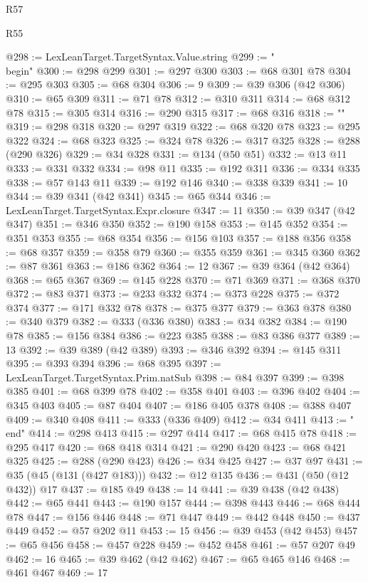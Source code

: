 \begin{lexlean}{R57}
\begin{lexlean}{R55}
\begin{coremodule}
{{{{{{{{{{{{{{{{{{{{{{{{{{{{{{{{{{{{{{{{{{{{{{{{{{{{{{{{{{{{@298 := LexLeanTarget.TargetSyntax.Value.string
@299 := "\\begin{"
@300 := @298 @299
@301 := @297 @300
@303 := @68 @301 @78
@304 := @295 @303
@305 := @68 @304
@306 := 9
@309 := @39 @306 (@42 @306)
@310 := @65 @309
@311 := @71 @78
@312 := @310 @311
@314 := @68 @312 @78
@315 := @305 @314
@316 := @290 @315
@317 := @68 @316
@318 := "}"
@319 := @298 @318
@320 := @297 @319
@322 := @68 @320 @78
@323 := @295 @322
@324 := @68 @323
@325 := @324 @78
@326 := @317 @325
@328 := @288 (@290 @326)
@329 := @34 @328
@331 := @134 (@50 @51)
@332 := @13 @11
@333 := @331 @332
@334 := @98 @11
@335 := @192 @311
@336 := @334 @335
@338 := @57 @143 @11
@339 := @192 @146
@340 := @338 @339
@341 := 10
@344 := @39 @341 (@42 @341)
@345 := @65 @344
@346 := LexLeanTarget.TargetSyntax.Expr.closure
@347 := 11
@350 := @39 @347 (@42 @347)
@351 := @346 @350
@352 := @190 @158
@353 := @145 @352
@354 := @351 @353
@355 := @68 @354
@356 := @156 @103
@357 := @188 @356
@358 := @68 @357
@359 := @358 @79
@360 := @355 @359
@361 := @345 @360
@362 := @87 @361
@363 := @186 @362
@364 := 12
@367 := @39 @364 (@42 @364)
@368 := @65 @367
@369 := @145 @228
@370 := @71 @369
@371 := @368 @370
@372 := @83 @371
@373 := @233 @332
@374 := @373 @228
@375 := @372 @374
@377 := @171 @332 @78
@378 := @375 @377
@379 := @363 @378
@380 := @340 @379
@382 := @333 (@336 @380)
@383 := @34 @382
@384 := @190 @78
@385 := @156 @384
@386 := @223 @385
@388 := @83 @386 @377
@389 := 13
@392 := @39 @389 (@42 @389)
@393 := @346 @392
@394 := @145 @311
@395 := @393 @394
@396 := @68 @395
@397 := LexLeanTarget.TargetSyntax.Prim.natSub
@398 := @84 @397
@399 := @398 @385
@401 := @68 @399 @78
@402 := @358 @401
@403 := @396 @402
@404 := @345 @403
@405 := @87 @404
@407 := @186 @405 @378
@408 := @388 @407
@409 := @340 @408
@411 := @333 (@336 @409)
@412 := @34 @411
@413 := "\\end{"
@414 := @298 @413
@415 := @297 @414
@417 := @68 @415 @78
@418 := @295 @417
@420 := @68 @418 @314
@421 := @290 @420
@423 := @68 @421 @325
@425 := @288 (@290 @423)
@426 := @34 @425
@427 := @37 @97
@431 := @35 (@45 (@131 (@427 @183)))
@432 := @12 @135
@436 := @431 (@50 (@12 @432)) @17
@437 := @185 @49
@438 := 14
@441 := @39 @438 (@42 @438)
@442 := @65 @441
@443 := @190 @157
@444 := @398 @443
@446 := @68 @444 @78
@447 := @156 @446
@448 := @71 @447
@449 := @442 @448
@450 := @437 @449
@452 := @57 @202 @11
@453 := 15
@456 := @39 @453 (@42 @453)
@457 := @65 @456
@458 := @457 @228
@459 := @452 @458
@461 := @57 @207 @49
@462 := 16
@465 := @39 @462 (@42 @462)
@467 := @65 @465 @146
@468 := @461 @467
@469 := 17
}}}}}}}}}}}}}}}}}}}}}}}}}}}}}}}}}}}}}}}}}}}}}}}}}}}}}}}}}}}}}
\end{coremodule}
\end{lexlean}
\end{lexlean}

